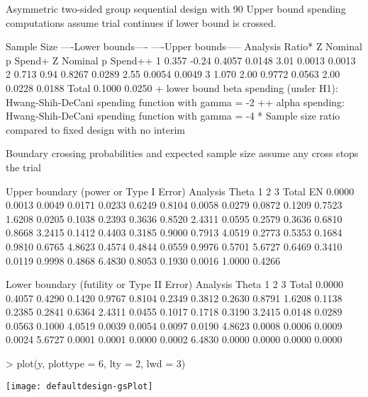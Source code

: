 \begin{Schunk}
\begin{Soutput}
Asymmetric two-sided group sequential design with
90 % power and 2.5 % Type I Error.
Upper bound spending computations assume
trial continues if lower bound is crossed.

           Sample
            Size    ----Lower bounds----  ----Upper bounds-----
  Analysis Ratio*   Z   Nominal p Spend+  Z   Nominal p Spend++
         1  0.357 -0.24    0.4057 0.0148 3.01    0.0013  0.0013
         2  0.713  0.94    0.8267 0.0289 2.55    0.0054  0.0049
         3  1.070  2.00    0.9772 0.0563 2.00    0.0228  0.0188
     Total                        0.1000                 0.0250 
+ lower bound beta spending (under H1):
 Hwang-Shih-DeCani spending function with gamma = -2
++ alpha spending:
 Hwang-Shih-DeCani spending function with gamma = -4
* Sample size ratio compared to fixed design with no interim

Boundary crossing probabilities and expected sample size
assume any cross stops the trial

Upper boundary (power or Type I Error)
          Analysis
   Theta      1      2      3  Total   E{N}
  0.0000 0.0013 0.0049 0.0171 0.0233 0.6249
  0.8104 0.0058 0.0279 0.0872 0.1209 0.7523
  1.6208 0.0205 0.1038 0.2393 0.3636 0.8520
  2.4311 0.0595 0.2579 0.3636 0.6810 0.8668
  3.2415 0.1412 0.4403 0.3185 0.9000 0.7913
  4.0519 0.2773 0.5353 0.1684 0.9810 0.6765
  4.8623 0.4574 0.4844 0.0559 0.9976 0.5701
  5.6727 0.6469 0.3410 0.0119 0.9998 0.4868
  6.4830 0.8053 0.1930 0.0016 1.0000 0.4266

Lower boundary (futility or Type II Error)
          Analysis
   Theta      1      2      3  Total
  0.0000 0.4057 0.4290 0.1420 0.9767
  0.8104 0.2349 0.3812 0.2630 0.8791
  1.6208 0.1138 0.2385 0.2841 0.6364
  2.4311 0.0455 0.1017 0.1718 0.3190
  3.2415 0.0148 0.0289 0.0563 0.1000
  4.0519 0.0039 0.0054 0.0097 0.0190
  4.8623 0.0008 0.0006 0.0009 0.0024
  5.6727 0.0001 0.0001 0.0000 0.0002
  6.4830 0.0000 0.0000 0.0000 0.0000
\end{Soutput}
\begin{Sinput}
> plot(y, plottype = 6, lty = 2, lwd = 3)
\end{Sinput}
\end{Schunk}

\texttt{[image: defaultdesign-gsPlot]}
